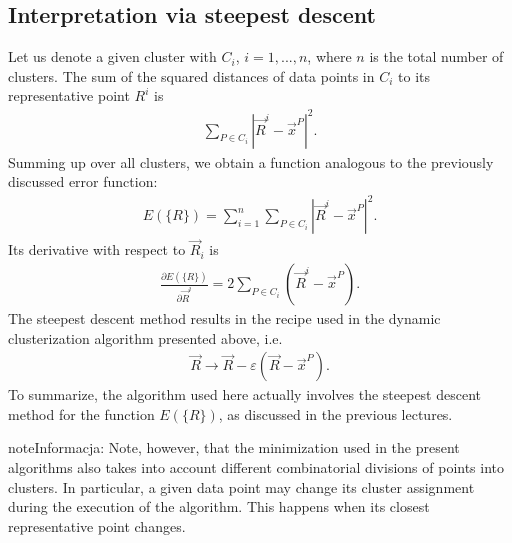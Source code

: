 \documentclass[a4paper,12pt,polish]{jupyterBook}
\begin{document}
\subsection{Interpretation via steepest descent}
\label{\detokenize{docs/unsupervised:interpretation-via-steepest-descent}}
\sphinxAtStartPar
Let us denote a given cluster with \(C_i\), \(i = 1, ..., n\), where \( n \) is the total number of clusters. The sum of the squared distances of data points in \( C_i \) to its representative point \( R ^ i \) is
\begin{equation*}
\begin{split}
\sum_{P \in C_i} | \vec{R}^i- \vec{x}^P|^2.
\end{split}
\end{equation*}
\sphinxAtStartPar
Summing up over all clusters, we obtain a function analogous to the previously discussed error function:
\begin{equation*}
\begin{split}E (\{R \}) = \sum_{i = 1}^ n \sum_ {P \in C_i} |\vec{R}^i- \vec{x}^P |^2 .\end{split}
\end{equation*}
\sphinxAtStartPar
Its derivative with respect to \( \vec{R}_i \) is
\begin{equation*}
\begin{split} \frac{\partial E (\{R \})}{\partial \vec{R}^i}
= 2 \sum_{P \in C_i} (\vec{R}^i- \vec{x}^P). \end{split}
\end{equation*}
\sphinxAtStartPar
The steepest descent method results  in the recipe used in the
dynamic clusterization algorithm presented above, i.e.
\begin{equation*}
\begin{split} \vec{R} \to \vec{R} - \varepsilon (\vec{R} - \vec {x}^P). \end{split}
\end{equation*}
\sphinxAtStartPar
To summarize, the algorithm used here actually involves the steepest descent method for the function \( E (\{R \})\), as discussed in the previous lectures.

\begin{sphinxadmonition}{note}{Informacja:}
\sphinxAtStartPar
Note, however, that the minimization used in the present algorithms also takes into account different combinatorial divisions of points into clusters. In particular, a given data point may change its cluster assignment during the execution of the algorithm. This happens when its closest representative point changes.
\end{sphinxadmonition}
\end{document}
